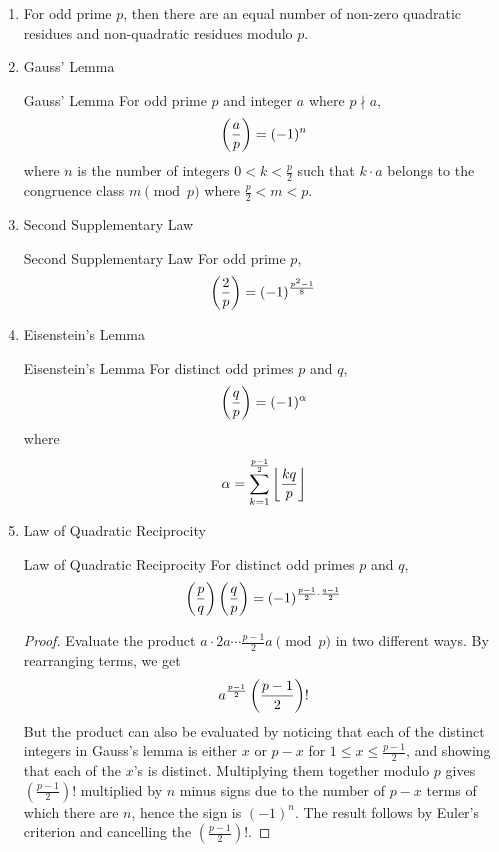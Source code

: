 \begin{enumerate}
\item For odd prime $p$, then there are an equal number of non-zero quadratic residues and non-quadratic residues modulo $p$.

\item Gauss' Lemma

\begin{thrm}{Gauss' Lemma}{}
For odd prime $p$ and integer $a$ where $p \nmid a$,
\[ \left(\dfrac{a}{p}\right) = (-1)^n \]
where $n$ is the number of integers $0 < k < \frac{p}{2}$ such that $k \cdot a$ belongs to the congruence class $m \pmod p$ where $\frac{p}{2} < m < p$.
\end{thrm}

\item Second Supplementary Law

\begin{thrm}{Second Supplementary Law}{}
For odd prime $p$,
\[ \left(\dfrac{2}{p}\right) = (-1)^{\frac{p^2-1}{8}} \]
\end{thrm}

\item Eisenstein’s Lemma

\begin{thrm}{Eisenstein’s Lemma}{}
For distinct odd primes $p$ and $q$,
\begin{equation}
\left(\dfrac{q}{p}\right) = (-1)^\alpha
\end{equation}
where
\[ \alpha = \sum_{k=1}^{\frac{p-1}{2}}\left\lfloor \frac{kq}{p} \right\rfloor \]
\end{thrm}

\item Law of Quadratic Reciprocity

\begin{thrm}{Law of Quadratic Reciprocity}{}
For distinct odd primes $p$ and $q$, 
\begin{equation}
\left(\dfrac{p}{q}\right) \left(\dfrac{q}{p}\right) = (-1)^{\frac{p-1}{2}\cdot\frac{q-1}{2}}
\end{equation}
\end{thrm}

\begin{proof}
Evaluate the product $a \cdot 2a \cdots \frac{p-1}{2}a \pmod p$ in two different ways. By rearranging terms, we get
\[ a^\frac{p-1}{2} \left(\frac{p-1}{2}\right)! \]
But the product can also be evaluated by noticing that each of the distinct integers in Gauss's lemma is either $x$ or $p-x$ for $1 \le x \le \frac{p-1}{2}$, and showing that each of the $x$'s is distinct. Multiplying them together modulo $p$ gives $(\frac{p-1}{2})!$ multiplied by $n$ minus signs due to the number of $p-x$ terms of which there are $n$, hence the sign is $(-1)^n$. The result follows by Euler's criterion and cancelling the $(\frac{p-1}{2})!$.
\end{proof}
\end{enumerate}

